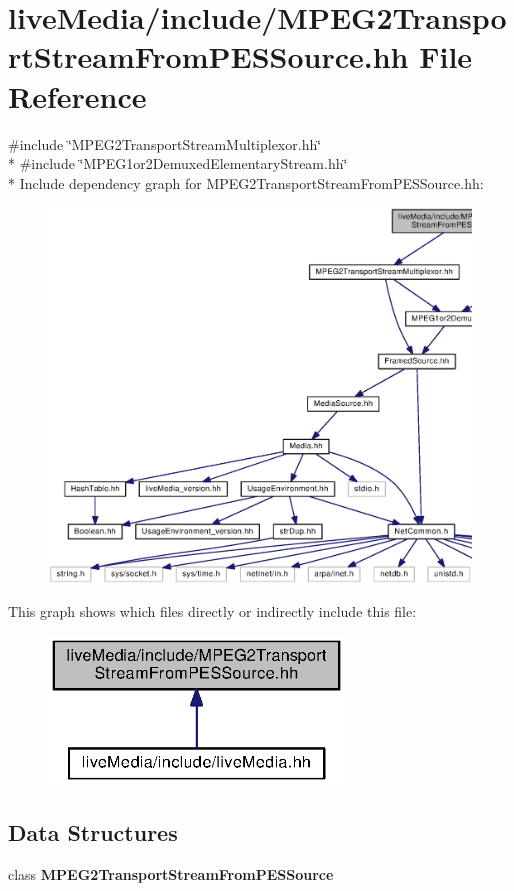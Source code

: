 \section{live\+Media/include/\+M\+P\+E\+G2\+Transport\+Stream\+From\+P\+E\+S\+Source.hh File Reference}
\label{MPEG2TransportStreamFromPESSource_8hh}
{\ttfamily \#include \char`\"{}M\+P\+E\+G2\+Transport\+Stream\+Multiplexor.\+hh\char`\"{}}\\*
{\ttfamily \#include \char`\"{}M\+P\+E\+G1or2\+Demuxed\+Elementary\+Stream.\+hh\char`\"{}}\\*
Include dependency graph for M\+P\+E\+G2\+Transport\+Stream\+From\+P\+E\+S\+Source.\+hh\+:
\nopagebreak
\begin{figure}[H]
\begin{center}
\leavevmode
\includegraphics[width=350pt]{MPEG2TransportStreamFromPESSource_8hh__incl}
\end{center}
\end{figure}
This graph shows which files directly or indirectly include this file\+:
\nopagebreak
\begin{figure}[H]
\begin{center}
\leavevmode
\includegraphics[width=223pt]{MPEG2TransportStreamFromPESSource_8hh__dep__incl}
\end{center}
\end{figure}
\subsection*{Data Structures}
\begin{DoxyCompactItemize}
\item 
class {\bf M\+P\+E\+G2\+Transport\+Stream\+From\+P\+E\+S\+Source}
\end{DoxyCompactItemize}
